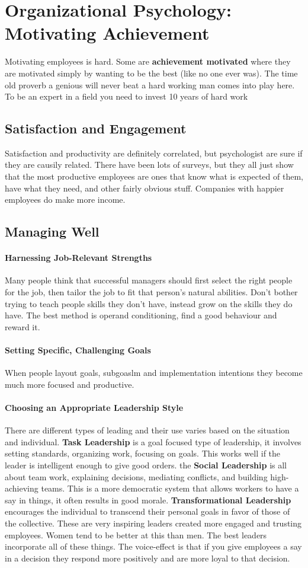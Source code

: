 \documentclass[12pt]{article}
\begin{document}
\section{Organizational Psychology: Motivating Achievement}
Motivating employees is hard. Some are \textbf{achievement motivated} where they are motivated simply by wanting to be the best (like no one ever was). The time old proverb a genious will never beat a hard working man comes into play here. To be an expert in a field you need to invest 10 years of hard work
\subsection*{Satisfaction and Engagement}
Satisfaction and productivity are definitely correlated, but psychologist are sure if they are causily related. There have been lots of surveys, but they all just show that the most productive employees are ones that know what is expected of them, have what they need, and  other fairly obvious stuff. Companies with happier employees do make more income.
\subsection*{Managing Well}
\paragraph*{Harnessing Job-Relevant Strengths} Many people think that successful managers should first select the right people for the job, then tailor the job to fit that person's natural abilities. Don’t bother trying to teach people skills they don’t have, instead grow on the skills they do have. The best method is operand conditioning, find a good behaviour and reward it.
\paragraph*{Setting Specific, Challenging Goals} When people layout goals, subgoaslm and implementation intentions they become much more focused and productive. 
\paragraph*{Choosing an Appropriate Leadership Style} There are different types of leading and their use varies based on the situation and individual. \textbf{Task Leadership} is a goal focused type of leadership, it involves setting standards, organizing work, focusing on goals. This works well if the leader is intelligent enough to give good orders. the \textbf{Social Leadership} is all about team work, explaining decisions, mediating conflicts, and building high-achieving teams. This is a more democratic system that allows workers to have a say in things, it often results in good morale. \textbf{Transformational Leadership} encourages the individual to transcend their personal goals in favor of those of the collective. These are very inspiring leaders created more engaged and trusting employees. Women tend to be better at this than men. The best leaders incorporate all of these things. The voice-effect is that if you give employees a say in a decision they respond more positively and are more loyal to that decision.
\end{document}
